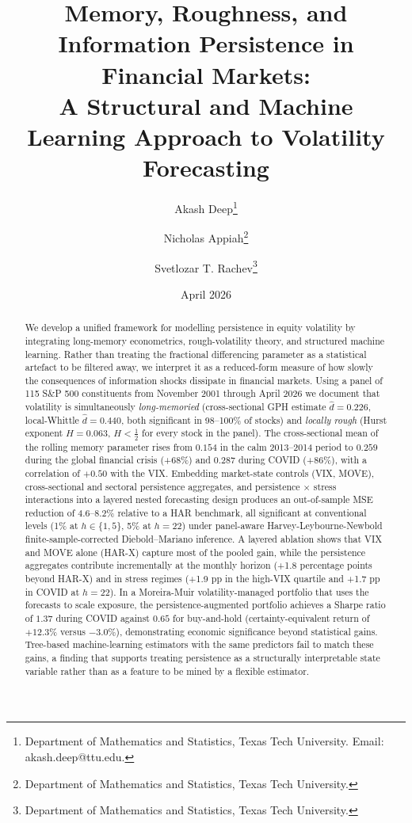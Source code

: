 \documentclass[11pt,a4paper]{article}
\title{\textbf{Memory, Roughness, and Information Persistence in Financial
Markets:\\[3pt] A Structural and Machine Learning Approach to Volatility
Forecasting}}
\author{
Akash Deep\thanks{Department of Mathematics and Statistics, Texas Tech
University. Email: akash.deep@ttu.edu.} \and
Nicholas Appiah\thanks{Department of Mathematics and Statistics, Texas
Tech University.} \and
Svetlozar T. Rachev\thanks{Department of Mathematics and Statistics, Texas
Tech University.}
}
\date{April 2026}
\newcommand{\dhat}{\hat d}
\begin{document}
\maketitle

\begin{abstract}
\noindent We develop a unified framework for modelling persistence in equity
volatility by integrating long-memory econometrics, rough-volatility theory,
and structured machine learning. Rather than treating the fractional
differencing parameter as a statistical artefact to be filtered away, we
interpret it as a reduced-form measure of how slowly the consequences of
information shocks dissipate in financial markets. Using a panel of 115
S\&P 500 constituents from November 2001 through April 2026 we document
that volatility is simultaneously \emph{long-memoried} (cross-sectional GPH
estimate $\dhat = 0.226$, local-Whittle $\dhat = 0.440$, both significant in
98--100\% of stocks) and \emph{locally rough} (Hurst exponent $H = 0.063$,
$H<\tfrac12$ for every stock in the panel). The cross-sectional mean of the
rolling memory parameter rises from $0.154$ in the calm 2013--2014 period to
$0.259$ during the global financial crisis (+68\%) and $0.287$ during COVID
(+86\%), with a correlation of $+0.50$ with the VIX. Embedding
market-state controls (VIX, MOVE), cross-sectional and sectoral
persistence aggregates, and persistence $\times$ stress interactions
into a layered nested forecasting design produces an out-of-sample
MSE reduction of 4.6--8.2\% relative to a HAR benchmark, all
significant at conventional levels (1\% at $h\in\{1,5\}$, 5\% at
$h=22$) under panel-aware Harvey-Leybourne-Newbold
finite-sample-corrected Diebold--Mariano inference. A layered ablation
shows that VIX and MOVE alone (HAR-X) capture most of the pooled gain,
while the persistence aggregates contribute incrementally at the
monthly horizon (+1.8 percentage points beyond HAR-X) and in stress
regimes (+1.9 pp in the high-VIX quartile and +1.7 pp in COVID at
$h=22$). In a Moreira-Muir volatility-managed portfolio that uses the
forecasts to scale exposure, the persistence-augmented portfolio
achieves a Sharpe ratio of $1.37$ during COVID against $0.65$ for
buy-and-hold (certainty-equivalent return of $+12.3\%$ versus
$-3.0\%$), demonstrating economic significance beyond statistical
gains. Tree-based machine-learning estimators with the same predictors
fail to match these gains, a finding that supports treating persistence
as a structurally interpretable state variable rather than as a feature
to be mined by a flexible estimator.
\end{abstract}
\end{document}
